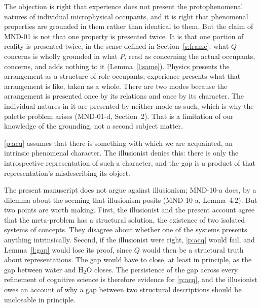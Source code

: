 \documentclass{situationist-preprint}
\begin{document}
\begin{reply}
The objection is right that experience does not present the protophenomenal natures of individual microphysical occupants, and it is right that phenomenal properties are grounded in them rather than identical to them. But the claim of MND-01 is not that one property is presented twice. It is that one portion of reality is presented twice, in the sense defined in Section~\ref{s:frame}: what $Q$ concerns is wholly grounded in what $P$, read as concerning the actual occupants, concerns, and adds nothing to it (Lemma~\ref{l:same}). Physics presents the arrangement as a structure of role-occupants; experience presents what that arrangement is like, taken as a whole. There are two modes because the arrangement is presented once by its relations and once by its character. The individual natures in it are presented by neither mode as such, which is why the palette problem arises (MND-01-d, Section~2). That is a limitation of our knowledge of the grounding, not a second subject matter.
\end{reply}

\begin{objection}[Illusionism]\label{o:illusion}
\ref{p:acq} assumes that there is something with which we are acquainted, an intrinsic phenomenal character. The illusionist denies this: there is only the introspective representation of such a character, and the gap is a product of that representation's misdescribing its object.
\end{objection}

\begin{reply}
The present manuscript does not argue against illusionism; MND-10-a does, by a dilemma about the seeming that illusionism posits (MND-10-a, Lemma~4.2). But two points are worth making. First, the illusionist and the present account agree that the meta-problem has a structural solution, the existence of two isolated systems of concepts. They disagree about whether one of the systems presents anything intrinsically. Second, if the illusionist were right, \ref{p:acq} would fail, and Lemma~\ref{l:gap} would lose its proof, since $Q$ would then be a structural truth about representations. The gap would have to close, at least in principle, as the gap between water and H$_2$O closes. The persistence of the gap across every refinement of cognitive science is therefore evidence for \ref{p:acq}, and the illusionist owes an account of why a gap between two structural descriptions should be unclosable in principle.
\end{reply}
\end{document}
